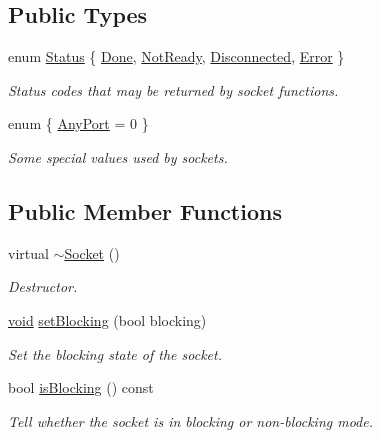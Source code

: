 \subsection*{Public Types}
\begin{DoxyCompactItemize}
\item 
enum \hyperlink{classsf_1_1_socket_a51bf0fd51057b98a10fbb866246176dc}{Status} \{ \hyperlink{classsf_1_1_socket_a51bf0fd51057b98a10fbb866246176dca1de3a85bc56d3ae85b3d0f3cfd04ae90}{Done}, 
\hyperlink{classsf_1_1_socket_a51bf0fd51057b98a10fbb866246176dca8554848daae98f996e131bdeed076c09}{Not\-Ready}, 
\hyperlink{classsf_1_1_socket_a51bf0fd51057b98a10fbb866246176dcab215141f756acdc23c67fad149710eb1}{Disconnected}, 
\hyperlink{classsf_1_1_socket_a51bf0fd51057b98a10fbb866246176dca1dc9854433a28c22e192721179a2df5d}{Error}
 \}
\begin{DoxyCompactList}\small\item\em Status codes that may be returned by socket functions. \end{DoxyCompactList}\item 
enum \{ \hyperlink{classsf_1_1_socket_a1b900779ad24d3604a4a000e2e38f372a5a3c30fd128895403afc11076f461b19}{Any\-Port} = 0
 \}
\begin{DoxyCompactList}\small\item\em Some special values used by sockets. \end{DoxyCompactList}\end{DoxyCompactItemize}
\subsection*{Public Member Functions}
\begin{DoxyCompactItemize}
\item 
virtual \hyperlink{classsf_1_1_socket_a79a4b5918f0b34a2f8db449089694788}{$\sim$\-Socket} ()
\begin{DoxyCompactList}\small\item\em Destructor. \end{DoxyCompactList}\item 
\hyperlink{glutf90_8h_ac778d6f63f1aaf8ebda0ce6ac821b56e}{void} \hyperlink{classsf_1_1_socket_a165fc1423e281ea2714c70303d3a9782}{set\-Blocking} (bool blocking)
\begin{DoxyCompactList}\small\item\em Set the blocking state of the socket. \end{DoxyCompactList}\item 
bool \hyperlink{classsf_1_1_socket_a0ec0d831b015e32eb5935fd2a9f8c67c}{is\-Blocking} () const 
\begin{DoxyCompactList}\small\item\em Tell whether the socket is in blocking or non-\/blocking mode. \end{DoxyCompactList}\end{DoxyCompactItemize}
